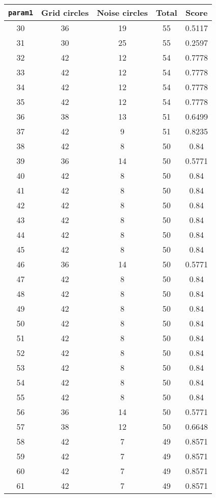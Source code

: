 \documentclass[letterpaper, 12pt]{article}
\begin{document}
\begin{longtable}{|c|c|c|c|c|}
\hline
\textbf{\texttt{param1}} & \textbf{Grid circles} & \textbf{Noise circles} & \textbf{Total} & \textbf{Score} \\
\hline
30 & 36 & 19 & 55 & 0.5117 \\
\hline
31 & 30 & 25 & 55 & 0.2597 \\
\hline
32 & 42 & 12 & 54 & 0.7778 \\
\hline
33 & 42 & 12 & 54 & 0.7778 \\
\hline
34 & 42 & 12 & 54 & 0.7778 \\
\hline
35 & 42 & 12 & 54 & 0.7778 \\
\hline
36 & 38 & 13 & 51 & 0.6499 \\
\hline
37 & 42 & 9 & 51 & 0.8235 \\
\hline
38 & 42 & 8 & 50 & 0.84 \\
\hline
39 & 36 & 14 & 50 & 0.5771 \\
\hline
40 & 42 & 8 & 50 & 0.84 \\
\hline
41 & 42 & 8 & 50 & 0.84 \\
\hline
42 & 42 & 8 & 50 & 0.84 \\
\hline
43 & 42 & 8 & 50 & 0.84 \\
\hline
44 & 42 & 8 & 50 & 0.84 \\
\hline
45 & 42 & 8 & 50 & 0.84 \\
\hline
46 & 36 & 14 & 50 & 0.5771 \\
\hline
47 & 42 & 8 & 50 & 0.84 \\
\hline
48 & 42 & 8 & 50 & 0.84 \\
\hline
49 & 42 & 8 & 50 & 0.84 \\
\hline
50 & 42 & 8 & 50 & 0.84 \\
\hline
51 & 42 & 8 & 50 & 0.84 \\
\hline
52 & 42 & 8 & 50 & 0.84 \\
\hline
53 & 42 & 8 & 50 & 0.84 \\
\hline
54 & 42 & 8 & 50 & 0.84 \\
\hline
55 & 42 & 8 & 50 & 0.84 \\
\hline
56 & 36 & 14 & 50 & 0.5771 \\
\hline
57 & 38 & 12 & 50 & 0.6648 \\
\hline
58 & 42 & 7 & 49 & 0.8571 \\
\hline
59 & 42 & 7 & 49 & 0.8571 \\
\hline
60 & 42 & 7 & 49 & 0.8571 \\
\hline
61 & 42 & 7 & 49 & 0.8571 \\

\end{longtable}
\end{document}
